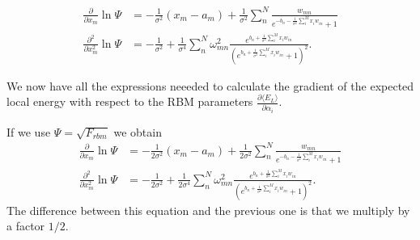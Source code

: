 \documentclass[%
oneside,                 %
final,                   %
10pt]{article}
\begin{document}
\begin{align}
	\frac{\partial}{\partial x_m} \ln\Psi
	&= - \frac{1}{\sigma^2}(x_m - a_m) + \frac{1}{\sigma^2} \sum_n^N \frac{w_{mn}}{e^{-b_n - \frac{1}{\sigma^2}\sum_i^M x_i w_{in}} + 1} \\
	\frac{\partial^2}{\partial x_m^2} \ln\Psi
	&= - \frac{1}{\sigma^2} + \frac{1}{\sigma^4}\sum_n^N \omega_{mn}^2 \frac{e^{b_n + \frac{1}{\sigma^2}\sum_i^M x_i w_{in}}}{(e^{b_n + \frac{1}{\sigma^2}\sum_i^M x_i w_{in}} + 1)^2}.
\end{align}

We now have all the expressions neeeded to calculate the gradient of
the expected local energy with respect to the RBM parameters
$\frac{\partial \langle E_L \rangle}{\partial \alpha_i}$.

If we use $\Psi = \sqrt{F_{rbm}}$ we obtain
\begin{align}
	\frac{\partial}{\partial x_m} \ln\Psi
	&= - \frac{1}{2\sigma^2}(x_m - a_m) + \frac{1}{2\sigma^2} \sum_n^N
 	\frac{w_{mn}}{e^{-b_n-\frac{1}{\sigma^2}\sum_i^M x_i w_{in}} + 1}
	\\
	\frac{\partial^2}{\partial x_m^2} \ln\Psi
	&= - \frac{1}{2\sigma^2} + \frac{1}{2\sigma^4}\sum_n^N \omega_{mn}^2 \frac{e^{b_n + \frac{1}{\sigma^2}\sum_i^M x_i w_{in}}}{(e^{b_n + \frac{1}{\sigma^2}\sum_i^M x_i w_{in}} + 1)^2}.
\end{align}
The difference between this equation and the previous one is that we multiply by a factor $1/2$.
\end{document}
